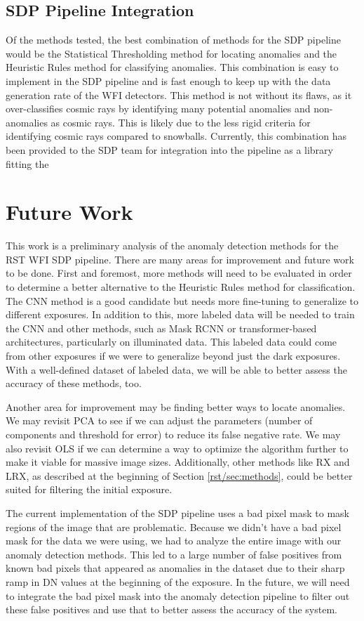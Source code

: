 \subsection{SDP Pipeline Integration}
Of the methods tested, the best combination of methods for the SDP pipeline would be the Statistical Thresholding method for locating anomalies and the Heuristic Rules method for classifying anomalies.
This combination is easy to implement in the SDP pipeline and is fast enough to keep up with the data generation rate of the WFI detectors.
This method is not without its flaws, as it over-classifies cosmic rays by identifying many potential anomalies and non-anomalies as cosmic rays.
This is likely due to the less rigid criteria for identifying cosmic rays compared to snowballs.
Currently, this combination has been provided to the SDP team for integration into the pipeline as a library fitting the 

\section{Future Work}
\label{rst/sec:future}
This work is a preliminary analysis of the anomaly detection methods for the RST WFI SDP pipeline.
There are many areas for improvement and future work to be done.
First and foremost, more methods will need to be evaluated in order to determine a better alternative to the Heuristic Rules method for classification. 
The CNN method is a good candidate but needs more fine-tuning to generalize to different exposures.
In addition to this, more labeled data will be needed to train the CNN and other methods, such as Mask RCNN or transformer-based architectures, particularly on illuminated data.
This labeled data could come from other exposures if we were to generalize beyond just the dark exposures.
With a well-defined dataset of labeled data, we will be able to better assess the accuracy of these methods, too. 

Another area for improvement may be finding better ways to locate anomalies.
We may revisit PCA to see if we can adjust the parameters (number of components and threshold for error) to reduce its false negative rate.
We may also revisit OLS if we can determine a way to optimize the algorithm further to make it viable for massive image sizes. 
Additionally, other methods like RX and LRX, as described at the beginning of Section \ref{rst/sec:methods}, could be better suited for filtering the initial exposure.

The current implementation of the SDP pipeline uses a bad pixel mask to mask regions of the image that are problematic. 
Because we didn't have a bad pixel mask for the data we were using, we had to analyze the entire image with our anomaly detection methods.
This led to a large number of false positives from known bad pixels that appeared as anomalies in the dataset due to their sharp ramp in DN values at the beginning of the exposure.
In the future, we will need to integrate the bad pixel mask into the anomaly detection pipeline to filter out these false positives and use that to better assess the accuracy of the system. 

